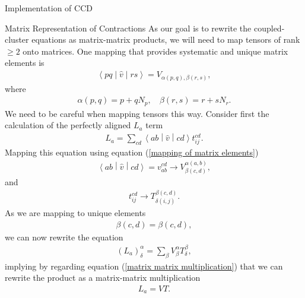 \documentclass[twoside,english]{uiofysmaster}
\begin{document}
\begin{chapter}{Implementation of CCD}
\begin{section}{Matrix Representation of Contractions}
		As our goal is to rewrite the coupled-cluster
                equations as matrix-matrix products, we will need to
                map tensors of rank $\geq 2$ onto matrices. One
                mapping that provides systematic and unique matrix
                elements is
		\begin{align}
			\left<pq\middle| \hat v\middle|rs\right> = V_{\alpha(p,q),\beta(r,s)},
		\end{align}
		where 
		\begin{align}
			\alpha(p,q) = p + q N_p, \;\,\:\; \beta(r,s) = r + s N_r.
			\label{mapping of matrix elements}
		\end{align}
		We need to be careful when mapping tensors this
                way. Consider first the calculation of the perfectly
                aligned $L_a$ term
		\begin{align}
			L_a = \sum_{cd} \left< ab \middle| \hat v\middle|cd\right> t_{ij}^{cd}.
		\end{align}
		Mapping this equation using equation (\ref{mapping of matrix elements})
		\begin{align}
			\left< ab \middle| \hat v\middle|cd\right> = v_{ab}^{cd} \rightarrow V_{\beta(c,d)}^{\alpha(a,b)},
		\end{align}
		and
		\begin{align}
			t_{ij}^{cd} \rightarrow T_{\delta(i,j)}^{\beta(c,d)}.
		\end{align}
		As we are mapping to unique elements 
		\begin{align}
			\beta(c,d) = \beta(c,d),
		\end{align}
		we can now rewrite the equation 
		\begin{align}
			(L_a)_ \delta^\alpha = \sum_ \beta V_ \beta^\alpha T_ \delta^\beta,
		\end{align}
		implying by regarding equation (\ref{matrix matrix multiplication}) that we can rewrite the product as a matrix-matrix multiplication 
		\begin{align}
			L_a = VT.
		\end{align}


\end{section}
\end{chapter}
\end{document}
